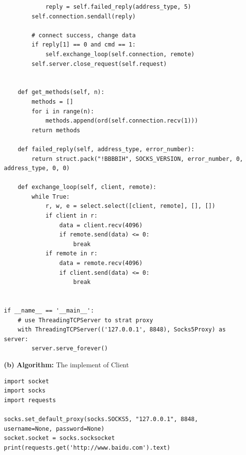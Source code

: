 \documentclass[11pt]{article}
\renewcommand\part[1]{\vspace{.10in}\textbf{(#1)}}
\newcommand\algorithm{\vspace{.10in}\textbf{Algorithm: }}
\begin{document}
\begin{lstlisting}
            reply = self.failed_reply(address_type, 5)
        self.connection.sendall(reply)

        # connect success, change data
        if reply[1] == 0 and cmd == 1:
            self.exchange_loop(self.connection, remote)
        self.server.close_request(self.request)

    
    def get_methods(self, n):
        methods = []
        for i in range(n):
            methods.append(ord(self.connection.recv(1)))
        return methods

    def failed_reply(self, address_type, error_number):
        return struct.pack("!BBBBIH", SOCKS_VERSION, error_number, 0, address_type, 0, 0)

    def exchange_loop(self, client, remote):
        while True:
            r, w, e = select.select([client, remote], [], [])
            if client in r:
                data = client.recv(4096)
                if remote.send(data) <= 0:
                    break
            if remote in r:
                data = remote.recv(4096)
                if client.send(data) <= 0:
                    break


if __name__ == '__main__':
    # use ThreadingTCPServer to strat proxy 
    with ThreadingTCPServer(('127.0.0.1', 8848), Socks5Proxy) as server:
        server.serve_forever()
\end{lstlisting}

\part{b} \algorithm The implement of Client
\begin{lstlisting}
import socket
import socks 
import requests

socks.set_default_proxy(socks.SOCKS5, "127.0.0.1", 8848, username=None, password=None)
socket.socket = socks.socksocket
print(requests.get('http://www.baidu.com').text)
\end{lstlisting}
\end{document}
